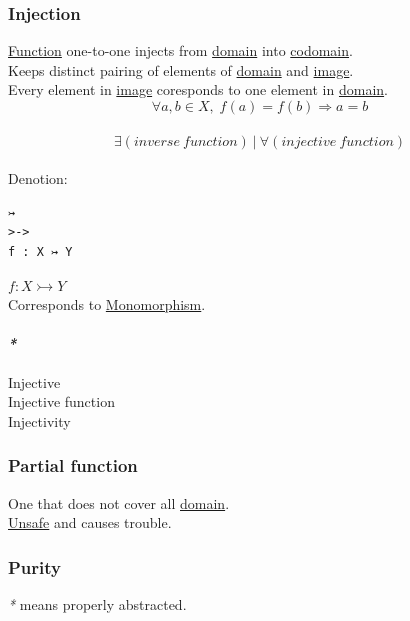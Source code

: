 \documentclass[11pt]{article}
\begin{document}
\subsubsection{\label{org2f0080f}Injection}
\label{sec:org90e77c6}
\hyperref[orgeb5cddb]{Function} one-to-one injects from \hyperref[orgf784585]{domain} into \hyperref[orgee70232]{codomain}.\\

Keeps distinct pairing of elements of \hyperref[orgf784585]{domain} and \hyperref[orgeb43f0e]{image}.\\
Every element in \hyperref[orgeb43f0e]{image} coresponds to one element in \hyperref[orgf784585]{domain}.\\

$$ \forall a,b \in X, \; f(a)=f(b) \Rightarrow a=b $$\\

$$ \exists (inverse \ function) \ | \ \forall (injective \ function) $$\\

Denotion:\\
\begin{verbatim}
↣
>->
f : X ↣ Y
\end{verbatim}
\(f : X \rightarrowtail Y\)\\

Corresponds to \hyperref[orgdcfcc77]{Monomorphism}.\\

\paragraph{\emph{*}}
\label{sec:org4009682}

\label{orgbdf10ff}Injective\\
\label{org9949c57}Injective function\\
\label{orgdf60d9a}Injectivity\\

\subsubsection{\label{org90143aa}Partial function}
\label{sec:orgd8e8257}
One that does not cover all \hyperref[orgf784585]{domain}.\\
\hyperref[org76b942a]{Unsafe} and causes trouble.\\

\subsubsection{\label{orgbc6acaf}Purity}
\label{sec:orgfc0c4eb}
\emph{*} means properly abstracted.\\
\end{document}
